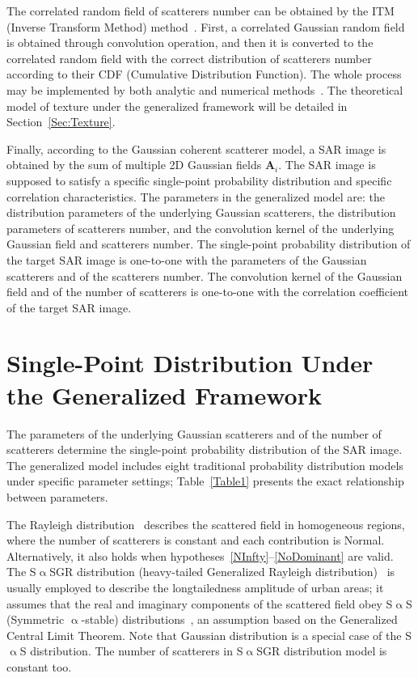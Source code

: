 \documentclass[journal]{IEEEtran}
\begin{document}
The correlated random field of scatterers number can be obtained by the ITM (Inverse Transform Method) method~\cite{Bustos:2009}.
First, a correlated Gaussian random field is obtained through convolution operation, and then it is converted to the correlated random field with the correct distribution of scatterers number according to their CDF (Cumulative Distribution Function).
The whole process may be implemented by both analytic and numerical methods~\cite{Yue:2019a}.
The theoretical model of texture under the generalized framework will be detailed in Section~\ref{Sec:Texture}.

Finally, according to the Gaussian coherent scatterer model, a SAR image is obtained by the sum of multiple 2D Gaussian fields $\boldsymbol{A}_{i}$.
The SAR image is supposed to satisfy a specific single-point probability distribution and specific correlation characteristics.
The parameters in the generalized model are:
the distribution parameters of the underlying Gaussian scatterers,
the distribution parameters of scatterers number, and
the convolution kernel of the underlying Gaussian field and scatterers number.
The single-point probability distribution of the target SAR image is one-to-one with the parameters of
the Gaussian scatterers and of
the scatterers number.
The convolution kernel of the Gaussian field and of the number of scatterers is one-to-one with the correlation coefficient of the target SAR image.

\section{Single-Point Distribution Under the Generalized Framework}\label{Sec:Distributions}

The parameters of the underlying Gaussian scatterers and of the number of scatterers determine the single-point probability distribution of the SAR image.
The generalized model includes eight traditional probability distribution models under specific parameter settings; Table~\ref{Table1} presents the exact relationship between parameters.

The Rayleigh distribution~\cite{Oliver:2004} describes the scattered field in homogeneous regions, where the number of scatterers is constant and each contribution is Normal.
Alternatively, it also holds when hypotheses~\ref{NInfty}--\ref{NoDominant} are valid.
The S$\upalpha$SGR distribution (heavy-tailed Generalized Rayleigh distribution)~\cite{Kuruoglu:2004} is usually employed to describe the longtailedness amplitude of urban areas; it assumes that the real and imaginary components of the scattered field obey S$\upalpha$S (Symmetric $\upalpha$-stable) distributions~\cite{Zhou:2011}, an assumption based on the Generalized Central Limit Theorem.
Note that Gaussian distribution is a special case of the S$\upalpha$S distribution.
The number of scatterers in S$\upalpha$SGR distribution model is constant too.
\end{document}
